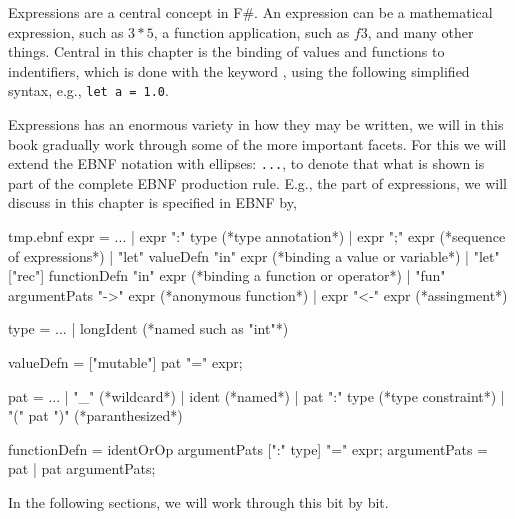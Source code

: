Expressions are a central concept in F\#. An expression can be a mathematical expression, such as $3*5$, a function application, such as $f 3$, and many other things. Central in this chapter is the binding of values and functions to indentifiers, which is done with the keyword , using the following simplified syntax, e.g., \lstinline!let a = 1.0!.

Expressions has an enormous variety in how they may be written, we will in this book gradually work through some of the more important facets. For this we will extend the EBNF notation with ellipses: \lstinline[language=ebnf]{...}, to denote that what is shown is part of the complete EBNF production rule. E.g., the part of expressions, we will discuss in this chapter is specified in EBNF by, 
%
\begin{verbatimwrite}{tmp.ebnf}
expr = ...
  | expr ":" type (*type annotation*)
  | expr ";" expr (*sequence of expressions*)
  | "let" valueDefn "in" expr (*binding a value or variable*)
  | "let" ["rec"] functionDefn "in" expr (*binding a function or operator*)
  | "fun" argumentPats "->" expr (*anonymous function*)
  | expr "<-" expr (*assingment*)
 
type = ...
  | longIdent (*named such as "int"*)

valueDefn = ["mutable"] pat "=" expr;

pat = ...
  | "_" (*wildcard*)
  | ident (*named*)
  | pat ":" type (*type constraint*)
  | "(" pat ")" (*paranthesized*)

functionDefn = identOrOp argumentPats [":" type] "=" expr;
argumentPats = pat | pat argumentPats;
\end{verbatimwrite}
%
In the following sections, we will work through this bit by bit.

